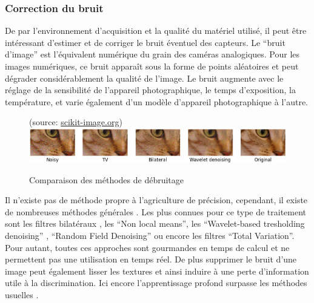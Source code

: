 \documentclass[../thesis.tex]{subfiles}
\begin{document}
    \newpage
    \subsubsection{Correction du bruit}
    
    \par De par l'environnement d'acquisition et la qualité du matériel utilisé, il peut être intéressant d'estimer et de corriger le bruit éventuel des capteurs. Le ``bruit d'image'' est l'équivalent numérique du grain des caméras analogiques. Pour les images numériques, ce bruit apparaît sous la forme de points aléatoires et peut dégrader considérablement la qualité de l'image. Le bruit augmente avec le réglage de la sensibilité de l'appareil photographique, le temps d'exposition, la température, et varie également d'un modèle d'appareil photographique à l'autre.
    
    \begin{figure}[H]
        \centering
        {\scriptsize (source: \href{https://scikit-image.org/docs/stable/auto_examples/filters/plot_denoise.html}{scikit-image.org})} \\
        \includegraphics[width=0.7\linewidth]{img/biblio/denoising}
        \caption{Comparaison des méthodes de débruitage}
        \label{fig:03-denoising}
    \end{figure}
    
    Il n'existe pas de méthode propre à l'agriculture de précision, cependant, il existe de nombreuses méthodes générales \cite{doi:10.1137/040616024}. Les plus connues pour ce type de traitement sont les filtres bilatéraux \cite{DBLP:journals/corr/ChaudhuryD16}, les ``Non local means'', les ``Wavelet-based tresholding denoising'' \cite{hao2014wavelet}, ``Random Field Denoising'' \cite{5173526} ou encore les filtres ``Total Variation''. Pour autant, toutes ces approches sont gourmandes en temps de calcul et ne permettent pas une utilisation en temps réel. De plus supprimer le bruit d'une image peut également lisser les textures et ainsi induire à une perte d'information utile à la discrimination. Ici encore l'apprentissage profond surpasse les méthodes usuelles \cite{tian2020deep, Zamir2020MIRNet}.
    
\end{document}
